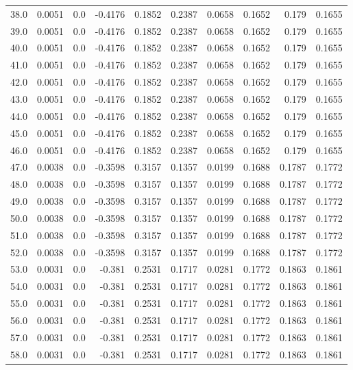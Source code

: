 \begin{longtable}{lrrrrrrrrr}
38.0 & 0.0051 & 0.0 & -0.4176 & 0.1852 & 0.2387 & 0.0658 & 0.1652 & 0.179 & 0.1655 \\
39.0 & 0.0051 & 0.0 & -0.4176 & 0.1852 & 0.2387 & 0.0658 & 0.1652 & 0.179 & 0.1655 \\
40.0 & 0.0051 & 0.0 & -0.4176 & 0.1852 & 0.2387 & 0.0658 & 0.1652 & 0.179 & 0.1655 \\
41.0 & 0.0051 & 0.0 & -0.4176 & 0.1852 & 0.2387 & 0.0658 & 0.1652 & 0.179 & 0.1655 \\
42.0 & 0.0051 & 0.0 & -0.4176 & 0.1852 & 0.2387 & 0.0658 & 0.1652 & 0.179 & 0.1655 \\
43.0 & 0.0051 & 0.0 & -0.4176 & 0.1852 & 0.2387 & 0.0658 & 0.1652 & 0.179 & 0.1655 \\
44.0 & 0.0051 & 0.0 & -0.4176 & 0.1852 & 0.2387 & 0.0658 & 0.1652 & 0.179 & 0.1655 \\
45.0 & 0.0051 & 0.0 & -0.4176 & 0.1852 & 0.2387 & 0.0658 & 0.1652 & 0.179 & 0.1655 \\
46.0 & 0.0051 & 0.0 & -0.4176 & 0.1852 & 0.2387 & 0.0658 & 0.1652 & 0.179 & 0.1655 \\
47.0 & 0.0038 & 0.0 & -0.3598 & 0.3157 & 0.1357 & 0.0199 & 0.1688 & 0.1787 & 0.1772 \\
48.0 & 0.0038 & 0.0 & -0.3598 & 0.3157 & 0.1357 & 0.0199 & 0.1688 & 0.1787 & 0.1772 \\
49.0 & 0.0038 & 0.0 & -0.3598 & 0.3157 & 0.1357 & 0.0199 & 0.1688 & 0.1787 & 0.1772 \\
50.0 & 0.0038 & 0.0 & -0.3598 & 0.3157 & 0.1357 & 0.0199 & 0.1688 & 0.1787 & 0.1772 \\
51.0 & 0.0038 & 0.0 & -0.3598 & 0.3157 & 0.1357 & 0.0199 & 0.1688 & 0.1787 & 0.1772 \\
52.0 & 0.0038 & 0.0 & -0.3598 & 0.3157 & 0.1357 & 0.0199 & 0.1688 & 0.1787 & 0.1772 \\
53.0 & 0.0031 & 0.0 & -0.381 & 0.2531 & 0.1717 & 0.0281 & 0.1772 & 0.1863 & 0.1861 \\
54.0 & 0.0031 & 0.0 & -0.381 & 0.2531 & 0.1717 & 0.0281 & 0.1772 & 0.1863 & 0.1861 \\
55.0 & 0.0031 & 0.0 & -0.381 & 0.2531 & 0.1717 & 0.0281 & 0.1772 & 0.1863 & 0.1861 \\
56.0 & 0.0031 & 0.0 & -0.381 & 0.2531 & 0.1717 & 0.0281 & 0.1772 & 0.1863 & 0.1861 \\
57.0 & 0.0031 & 0.0 & -0.381 & 0.2531 & 0.1717 & 0.0281 & 0.1772 & 0.1863 & 0.1861 \\
58.0 & 0.0031 & 0.0 & -0.381 & 0.2531 & 0.1717 & 0.0281 & 0.1772 & 0.1863 & 0.1861 \\

\end{longtable}
